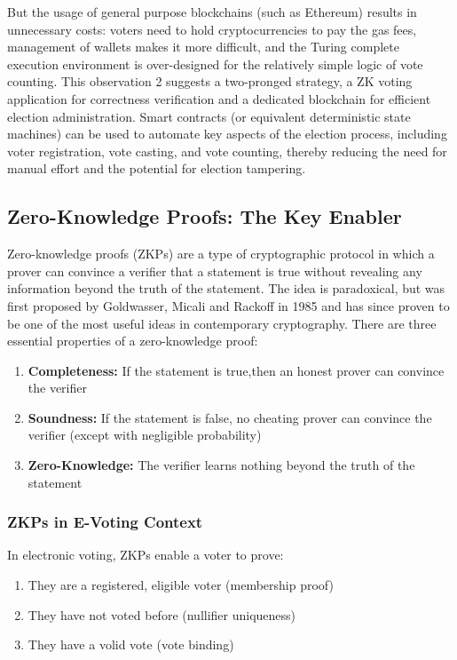 \documentclass[12pt, a4paper]{report}
\begin{document}
But the usage of general purpose blockchains (such as Ethereum) results in unnecessary costs: voters need to hold cryptocurrencies to pay the gas fees, management of wallets makes it more difficult, and the Turing complete execution environment is over-designed for the relatively simple logic of vote counting. This observation 2 suggests a two-pronged strategy, a ZK voting application for correctness verification and a dedicated blockchain for efficient election administration.
Smart contracts (or equivalent deterministic state machines) can be used to automate key aspects of the election process, including voter registration, vote casting, and vote counting, thereby reducing the need for manual effort and the potential for election tampering.

\subsection{Zero-Knowledge Proofs: The Key Enabler}

Zero-knowledge proofs (ZKPs) are a type of cryptographic protocol in which a prover can convince a verifier that a statement is true without revealing any information beyond the truth of the statement. The idea is paradoxical, but was first proposed by Goldwasser, Micali and Rackoff in 1985 and has since proven to be one of the most useful ideas in contemporary cryptography. 
There are three essential properties of a zero-knowledge proof:
\begin{enumerate}
    \item \textbf{Completeness:} If the statement is true,then an honest prover can convince the verifier
    \item \textbf{Soundness:} If the statement is false, no cheating prover can convince the verifier (except with negligible probability)
    \item \textbf{Zero-Knowledge:} The verifier learns nothing beyond the truth of the statement
\end{enumerate}

\subsubsection{ZKPs in E-Voting Context}

In electronic voting, ZKPs enable a voter to prove:
\begin{enumerate}
    \item They are a registered, eligible voter (membership proof)
    \item They have not voted before (nullifier uniqueness)
    \item They have a volid vote (vote binding)
\end{enumerate}
\end{document}
